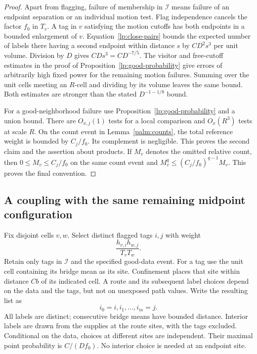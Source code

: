 \begin{proof}
Apart from flagging, failure of membership in $\mathcal I$ means failure of an
endpoint separation or an individual motion test.  Flag independence
cancels the factor $f_0$ in $T_v$.  A tag in $v$ satisfying the motion
cutoffs has both endpoints in a bounded enlargement of $v$.
Equation~\eqref{lp:close-pairs} bounds the expected number of labels there
having a second endpoint within distance $s$ by $CD^2s^3$ per unit
volume.  Division by $D$ gives $CDs^3=CD^{-7/5}$.
The visitor and free-cutoff estimates in the proof of
Proposition~\ref{lp:good-probability} give errors of arbitrarily high fixed
power for the remaining motion failures.  Summing over the unit cells
meeting an $R$-cell and dividing by its volume leaves the same bound.
Both estimates are stronger than the stated $D^{-1-1/8}$ bound.

For a good-neighborhood failure use Proposition~\ref{lp:good-probability}
and a union bound.  There are $O_{x,j}(1)$ tests for a local comparison
and $O_x(R^3)$ tests at scale $R$.  On the count event in
Lemma~\ref{palm:counts}, the total reference weight is bounded by
$C_j/f_0$.  Its complement is negligible.  This proves the second
claim and the assertion about products.
If $M_v$ denotes the omitted relative count, then
$0\le M_v\le C_j/f_0$ on the same count event and
$M_v^q\le(C_j/f_0)^{q-1}M_v$.  This proves the final convention.
\end{proof}

\subsection{A coupling with the same remaining midpoint configuration}

Fix disjoint cells $v,w$.  Select distinct flagged tags $i,j$ with
weight
\begin{equation}\label{palm:two-tag-weight}
             \frac{h_{v,i}h_{w,j}}{T_vT_w}.
\end{equation}
Retain only tags in $\mathcal I$ and the specified good-data event.  For a tag
use the unit cell containing its bridge mean as its site.  Confinement
places that site within distance $Cb$ of its indicated cell.
A route and its subsequent label choices depend on the data and the
tags, but not on unexposed path values.  Write the resulting list as
\begin{equation}\label{palm:label-list}
                 i_0=i,i_1,\ldots,i_m=j.
\end{equation}
All labels are distinct; consecutive bridge means have bounded
distance.  Interior labels are drawn from the supplies at the route
sites, with the tags excluded.  Conditional on the data, choices at
different sites are independent.  Their maximal point probability
is $C/(Df_0)$.  No interior choice is needed at an endpoint site.

